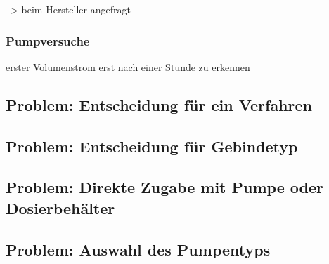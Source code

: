 --> beim Hersteller angefragt

\subsubsection{Pumpversuche}

erster Volumenstrom erst nach einer Stunde zu erkennen 



\subsection{Problem: Entscheidung für ein Verfahren}

\subsection{Problem: Entscheidung für Gebindetyp}

\subsection{Problem: Direkte Zugabe mit Pumpe oder Dosierbehälter}

\subsection{Problem: Auswahl des Pumpentyps}

